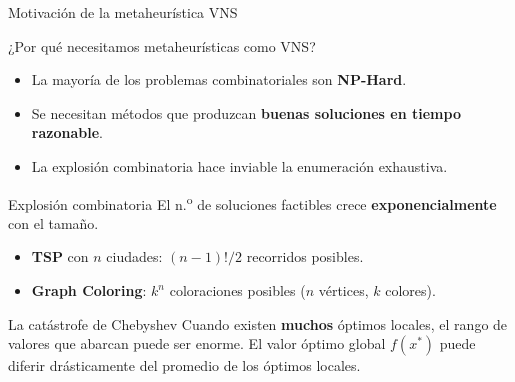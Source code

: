 \documentclass[aspectratio=169, 11pt, xcolor={dvipsnames,table}]{beamer}
\begin{document}
\begin{frame}{Motivación de la metaheurística VNS}
\begin{block}{¿Por qué necesitamos metaheurísticas como VNS?}
\begin{itemize}
  \item La mayoría de los problemas combinatoriales son \textbf{NP-Hard}.
  \item Se necesitan métodos que produzcan \textbf{buenas soluciones en tiempo razonable}.
  \item La explosión combinatoria hace inviable la enumeración exhaustiva.
\end{itemize}
\end{block}

\begin{exampleblock}{Explosión combinatoria}
El n.\textsuperscript{o} de soluciones factibles crece \textbf{exponencialmente} con el tamaño.
\begin{itemize}
  \item \textbf{TSP} con $n$ ciudades: $(n-1)!/2$ recorridos posibles.
  \item \textbf{Graph Coloring}: $k^n$ coloraciones posibles ($n$ vértices, $k$ colores).
\end{itemize}
\end{exampleblock}

\begin{alertblock}{La catástrofe de Chebyshev}
Cuando existen \textbf{muchos} óptimos locales, el rango de valores que abarcan puede ser enorme.
El valor óptimo global $f(x^*)$ puede diferir drásticamente del promedio de los óptimos locales.
\end{alertblock}

\end{frame}
\end{document}
